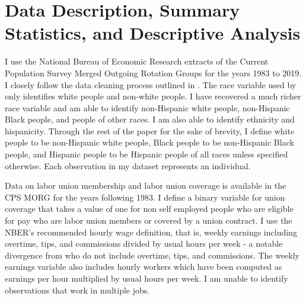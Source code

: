 \documentclass[11pt]{article}
\begin{document}

\section{Data Description, Summary Statistics, and Descriptive Analysis}
I use the National Bureau of Economic Research extracts of the Current Population Survey Merged Outgoing Rotation Groups for the years 1983 to 2019. I closely follow the data cleaning process outlined in \citet{fll2021}. The race variable used by \citet{fll2021} only identifies white people and non-white people. I have recovered a much richer race variable and am able to identify non-Hispanic white people, non-Hispanic Black people, and people of other races. I am also able to identify ethnicity and hispanicity. Through the rest of the paper for the sake of brevity, I define white people to be non-Hispanic white people, Black people to be non-Hispanic Black people, and Hispanic people to be Hispanic people of all races unless specified otherwise. Each observation in my dataset represents an individual.

Data on labor union membership and labor union coverage is available in the CPS MORG for the years following 1983. I define a binary variable for union coverage that takes a value of one for non self employed people who are eligible for pay who are labor union members or covered by a union contract. I use the NBER's recommended hourly wage definition, that is, weekly earnings including overtime, tips, and commissions divided by usual hours per week - a notable divergence from \citet{fll2021} who do not include overtime, tips, and commissions. The weekly earnings variable also includes hourly workers which have been computed as earnings per hour multiplied by usual hours per week. I am unable to identify observations that work in multiple jobs. 
\end{document}
